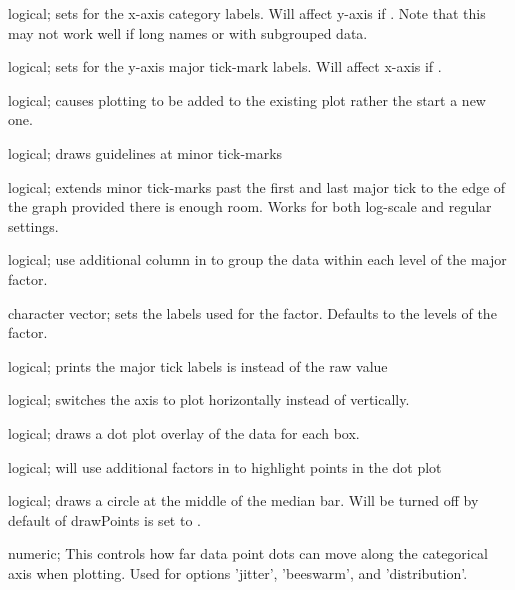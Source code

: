 \documentclass[a4paper]{book}
\begin{document}
\begin{Arguments}
\begin{ldescription}
\item[\code{rotateLabels}] logical; sets  for the x-axis category labels. Will affect y-axis if . Note that this may not work well if long names or with subgrouped data.

\item[\code{rotateY}] logical; sets  for the y-axis major tick-mark labels. Will affect x-axis if .

\item[\code{add}] logical; causes plotting to be added to the existing plot rather the start a new one.

\item[\code{minorGuides}] logical; draws guidelines at minor tick-marks

\item[\code{extendTicks}] logical; extends minor tick-marks past the first and last major tick to the edge of the graph provided there is enough room. Works for both log-scale and regular settings.

\item[\code{subGroup}] logical; use additional column in  to group the data within each level of the major factor.

\item[\code{subGroupLabels}] character vector; sets the labels used for the  factor. Defaults to the levels of the factor.

\item[\code{expLabels}] logical; prints the major tick labels is  instead of the raw value

\item[\code{sidePlot}] logical; switches the axis to plot horizontally instead of vertically.

\item[\code{drawPoints}] logical; draws a dot plot overlay of the data for each box.

\item[\code{pointHighlights}] logical; will use additional factors in  to highlight points in the dot plot

\item[\code{drawCenterDot}] logical; draws a circle at the middle of the median bar. Will be turned off by default of drawPoints is set to .

\item[\code{pointLaneWidth}] numeric; This controls how far data point dots can move along the categorical axis when plotting. Used for  options 'jitter', 'beeswarm', and 'distribution'.


\end{ldescription}
\end{Arguments}
\end{document}
